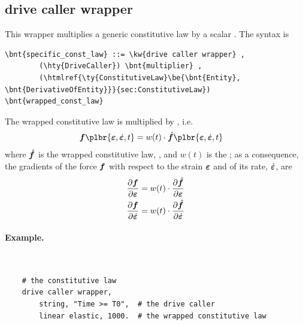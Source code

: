 \subsection{drive caller wrapper}
This wrapper multiplies a generic constitutive law by a scalar .
The syntax is
\begin{Verbatim}[commandchars=\\\{\}]
    \bnt{specific_const_law} ::= \kw{drive caller wrapper} ,
        (\hty{DriveCaller}) \bnt{multiplier} ,
        (\htmlref{\ty{ConstitutiveLaw}\be{\bnt{Entity}, \bnt{DerivativeOfEntity}}}{sec:ConstitutiveLaw}) \bnt{wrapped_const_law}
\end{Verbatim}
The wrapped constitutive law  is multiplied by , i.e.\
\begin{align}
	\T{f}\plbr{\T{\varepsilon}, \dot{\T{\varepsilon}}, t} &= w(t) \cdot \hat{\T{f}}\plbr{\T{\varepsilon}, \dot{\T{\varepsilon}}, t}
\end{align}
where $\hat{\boldsymbol{f}}$ is the wrapped constitutive law, , and $w(t)$ is the  ;
as a consequence, the gradients of the force $\boldsymbol{f}$ with respect to the strain $\boldsymbol{\varepsilon}$ and of its rate, $\dot{\boldsymbol{\varepsilon}}$,
are
\begin{subequations}
\begin{align}
	\frac{\partial \boldsymbol{f}}{\partial\boldsymbol{\varepsilon}} &= w(t) \cdot \frac{\partial \hat{\boldsymbol{f}}}{\partial\boldsymbol{\varepsilon}}
	\\
	\frac{\partial \boldsymbol{f}}{\partial\dot{\boldsymbol{\varepsilon}}} &= w(t) \cdot \frac{\partial \hat{\boldsymbol{f}}}{\partial\dot{\boldsymbol{\varepsilon}}}
\end{align}
\end{subequations}

\paragraph{Example.} \
\begin{verbatim}
    # the constitutive law
    drive caller wrapper,
        string, "Time >= T0",  # the drive caller
        linear elastic, 1000.  # the wrapped constitutive law
\end{verbatim}


